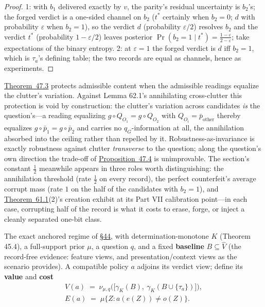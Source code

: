 \begin{proof}

1: with \(b_1\) delivered exactly by \(v\), the parity's residual uncertainty is \(b_2\)'s; the forged verdict is a one-sided channel on \(b_2\) (\(t^*\) certainly when \(b_2 = 0\); \(d\) with probability \(\varepsilon\) when \(b_2 = 1\)), so the verdict \(d\) (probability \(\varepsilon/2\)) resolves \(b_2\) and the verdict \(t^*\) (probability \(1 - \varepsilon/2\)) leaves posterior \(\Pr(b_2 = 1 \mid t^*) = \tfrac{1-\varepsilon}{2-\varepsilon}\); take expectations of the binary entropy. 2: at \(\varepsilon = 1\) the forged verdict is \(d\) iff \(b_2 = 1\), which is \(\tau_a\)'s defining table; the two records are equal as channels, hence as experiments.
\end{proof}

\begin{thmrem}

\hyperlink{stmt:47.3}{Theorem~47.3} protects admissible content when the admissible readings equalize the clutter's variation. Against Lemma 62.1's annihilating cross-clutter this protection is void by construction: the clutter's variation across candidates \emph{is} the question's---\hspace{0pt}a reading equalizing \(g \circ Q_{O_1} = g \circ Q_{O_2}\) with \(Q_{O_i} = \bar p_{\text{other}}\) thereby equalizes \(g \circ \bar p_1 = g \circ \bar p_2\) and carries no \(q_G\)-information at all, the annihilation absorbed into the ceiling rather than repelled by it. Robustness-as-invariance is exactly robustness against clutter \emph{transverse} to the question; along the question's own direction the trade-off of \hyperlink{stmt:47.4}{Proposition~47.4} is unimprovable. The section's constant \(\tfrac12\) meanwhile appears in three roles worth distinguishing: the annihilation threshold (rate \(\tfrac12\) on every record), the perfect counterfeit's average corrupt mass (rate \(1\) on the half of the candidates with \(b_2 = 1\)), and \hyperlink{stmt:61.1}{Theorem~61.1}(2)'s creation exhibit at its Part VII calibration point---\hspace{0pt}in each case, corrupting half of the record is what it costs to erase, forge, or inject a cleanly separated one-bit class.
\end{thmrem}


The exact anchored regime of \hyperlink{sec:44}{§44}, with determination-monotone \(K\) (Theorem 45.4), a full-support prior \(\mu\), a question \(q\), and a fixed \textbf{baseline} \(B \subseteq \widehat{V}\) (the record-free evidence: feature views, and presentation/context views as the scenario provides). A compatible policy \(a\) adjoins its verdict view; define its \textbf{value} and \textbf{cost}
\[\begin{gathered}V(a) \;=\; \nu_{\mu,q}\big(\big[\gamma_K(B),\ \gamma_K(B \cup \{\tau_a\})\big]\big), \\ E(a) \;=\; \mu\{Z : a(e(Z)) \ne o(Z)\}.\end{gathered}\]

